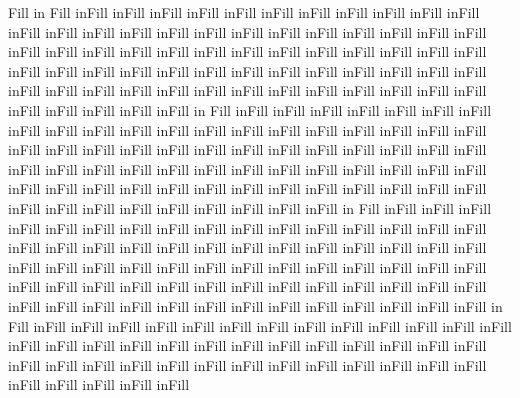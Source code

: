 \documentclass[9pt,a4paper,twocolumn,twoside]{rho-class/rho}
\begin{document}
	Fill in Fill inFill inFill inFill inFill inFill inFill inFill inFill inFill inFill inFill inFill inFill inFill inFill inFill inFill inFill inFill inFill inFill inFill inFill inFill inFill inFill inFill inFill inFill inFill inFill inFill inFill inFill inFill inFill inFill inFill inFill inFill inFill inFill inFill inFill inFill inFill inFill inFill inFill inFill inFill inFill inFill inFill inFill inFill inFill inFill inFill inFill inFill inFill inFill inFill inFill inFill inFill inFill in Fill inFill inFill inFill inFill inFill inFill inFill inFill inFill inFill inFill inFill inFill inFill inFill inFill inFill inFill inFill inFill inFill inFill inFill inFill inFill inFill inFill inFill inFill inFill inFill inFill inFill inFill inFill inFill inFill inFill inFill inFill inFill inFill inFill inFill inFill inFill inFill inFill inFill inFill inFill inFill inFill inFill inFill inFill inFill inFill inFill inFill inFill inFill inFill inFill inFill inFill inFill inFill in Fill inFill inFill inFill inFill inFill inFill inFill inFill inFill inFill inFill inFill inFill inFill inFill inFill inFill inFill inFill inFill inFill inFill inFill inFill inFill inFill inFill inFill inFill inFill inFill inFill inFill inFill inFill inFill inFill inFill inFill inFill inFill inFill inFill inFill inFill inFill inFill inFill inFill inFill inFill inFill inFill inFill inFill inFill inFill inFill inFill inFill inFill inFill inFill inFill inFill inFill inFill inFill in Fill inFill inFill inFill inFill inFill inFill inFill inFill inFill inFill inFill inFill inFill inFill inFill inFill inFill inFill inFill inFill inFill inFill inFill inFill inFill inFill inFill inFill inFill inFill inFill inFill inFill inFill inFill inFill inFill inFill inFill inFill inFill inFill inFill inFill 
	
	
	\printbibliography
	
	
\end{document}

